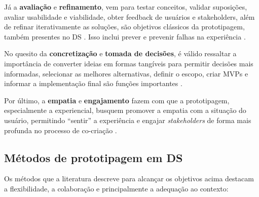 Já a \textbf{avaliação} e \textbf{refinamento}, vem para testar conceitos, validar suposições, avaliar usabilidade e viabilidade, obter feedback de usuários e stakeholders, além de refinar iterativamente as soluções, são objetivos clássicos da prototipagem, também presentes no DS \cite{paust2025integrative, hegemann2024palette, quintero2021interdisciplinary, mager2023product, Vieira2025, asbjornsen2022echange, villa2022integratedcare}. Isso inclui prever e prevenir falhas na experiência \cite{mager2023product}.

No quesito da \textbf{concretização} e \textbf{tomada de decisões}, é válido ressaltar a importância de converter ideias em formas tangíveis para permitir decisões mais informadas, selecionar as melhores alternativas, definir o escopo, criar MVPs e informar a implementação final são funções importantes \cite{nguyen2022human, Vieira2025, schlott2024design, quintero2021interdisciplinary, iriarte2023service}.

Por último, a \textbf{empatia} e \textbf{engajamento} fazem com que a prototipagem, especialmente a experiencial, busquem promover a empatia com a situação do usuário, permitindo ``sentir'' a experiência e engajar \textit{stakeholders} de forma mais profunda no processo de co-criação \cite{soto2023prototyping, lambe2022capabilities, kumar2023rheumatology}.

\subsection{Métodos de prototipagem em DS}

Os métodos que a literatura descreve para alcançar os objetivos acima destacam a flexibilidade, a colaboração e principalmente a adequação ao contexto:


